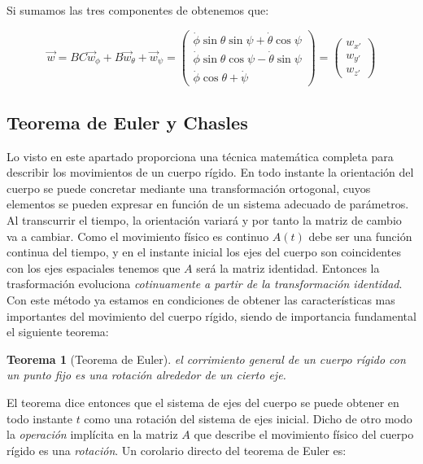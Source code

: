 \documentclass[12pt,a4paper]{book}
\newtheorem{theorem}{Teorema}[section]
\begin{document}
Si sumamos las tres componentes de obtenemos que:

\begin{equation}
\vec{w} = BC \vec{w}_\phi + B \vec{w}_\theta + \vec{w}_\psi = \begin{pmatrix}
\dot{\phi} \sin \theta \sin \psi + \dot{\theta} \cos \psi \\
\dot{\phi} \sin \theta \cos \psi - \dot{\theta} \sin \psi \\
\dot{\phi} \cos \theta + \dot{\psi}
\end{pmatrix} = \begin{pmatrix}
w_{x'} \\
w_{y'} \\
w_{z'}
\end{pmatrix} \label{Ec:3.1-017}
\end{equation}

\subsection{Teorema de Euler y Chasles}

Lo visto en este apartado proporciona una técnica matemática completa para describir los movimientos de un cuerpo rígido. En todo instante la orientación del  cuerpo se puede concretar mediante una transformación ortogonal, cuyos elementos se pueden expresar en función de un sistema adecuado de parámetros. Al transcurrir el tiempo, la orientación variará y por tanto la matriz de cambio va a cambiar. Como el movimiento físico es continuo $A(t)$ debe ser una función continua  del tiempo, y en el instante inicial los ejes del cuerpo son coincidentes con los ejes espaciales tenemos que $A$ será la matriz identidad. Entonces la trasformación evoluciona \textit{cotinuamente a partir de la transformación identidad}. Con este método ya estamos en condiciones de obtener las características mas importantes del movimiento del cuerpo rígido, siendo de importancia fundamental el siguiente teorema:

\begin{theorem}[Teorema de Euler]
el corrimiento general de un cuerpo rígido con un punto fijo es una rotación alrededor de un cierto eje. 
\end{theorem}

El teorema dice entonces que el sistema de ejes del cuerpo se puede obtener en todo instante $t$ como una rotación del sistema de ejes inicial. Dicho de otro modo la \textit{operación} implícita en la matriz $A$ que describe el movimiento físico del cuerpo rígido es una \textit{rotación}. Un corolario directo del teorema de Euler es:
\end{document}
